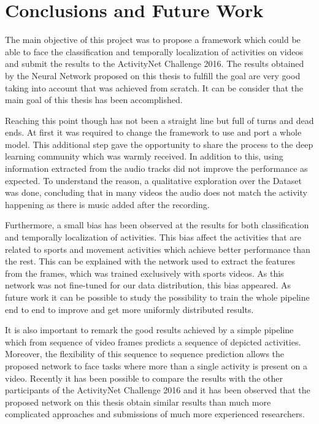 \chapter{Conclusions and Future Work}

The main objective of this project was to propose a framework which could be able to face the classification and temporally localization of activities on videos and submit the results to the ActivityNet Challenge 2016. The results obtained by the Neural Network proposed on this thesis to fulfill the goal are very good taking into account that was achieved from scratch. It can be consider that the main goal of this thesis has been accomplished.

Reaching this point though has not been a straight line but full of turns and dead ends. At first it was required to change the framework to use and port a whole model. This additional step gave the opportunity to share the process to the deep learning community which was warmly received. In addition to this, using information extracted from the audio tracks did not improve the performance as expected. To understand the reason, a qualitative exploration over the Dataset was done, concluding that in many videos the audio does not match the activity happening as there is music added after the recording.

Furthermore, a small bias has been observed at the results for both classification and temporally localization of activities. This bias affect the activities that are related to sports and movement activities which achieve better performance than the rest. This can be explained with the network used to extract the features from the frames, which was trained exclusively with sports videos. As this network was not fine-tuned for our data distribution, this bias appeared. As future work it can be possible to study the possibility to train the whole pipeline end to end to improve and get more uniformly distributed results.

It is also important to remark the good results achieved by a simple pipeline which from sequence of video frames predicts a sequence of depicted activities. Moreover, the flexibility of this sequence to sequence prediction allows the proposed network to face tasks where more than a single activity is present on a video. Recently it has been possible to compare the results with the other participants of the ActivityNet Challenge 2016 and it has been observed that the proposed network on this thesis obtain similar results than much more complicated approaches \cite{singhmulti} and submissions of much more experienced researchers.


